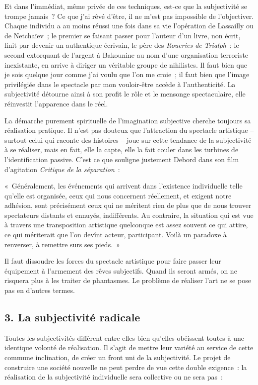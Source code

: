 \documentclass[french,twoside]{book} %
\newenvironment{quoteblock}%
  {\begin{quoting}}
  {\end{quoting}}
\newenvironment{quotebar}{%
    \def\FrameCommand{{\color{rubric!10!}\vrule width 0.5em} \hspace{0.9em}}%
    \def\OuterFrameSep{\itemsep} %
    \MakeFramed {\advance\hsize-\width \FrameRestore}
  }%
  {%
    \endMakeFramed
  }
\renewenvironment{quoteblock}%
  {%
    \savenotes
    \setstretch{0.9}
    \normalfont
    \begin{quotebar}
  }
  {%
    \end{quotebar}
    \spewnotes
  }
\begin{document}
Et dans l’immédiat, même privée de ces techniques, est-ce que la subjectivité se trompe jamais ? Ce que j’ai rêvé d’être, il ne m’est pas impossible de l’objectiver. Chaque individu a au moins réussi une fois dans sa vie l’opération de Lassailly ou de Netchaïev ; le premier se faisant passer pour l’auteur d’un livre, non écrit, finit par devenir un authentique écrivain, le père des \emph{Roueries de Trialph} ; le second extorquant de l’argent à Bakounine au nom d’une organisation terroriste inexistante, en arrive à diriger un véritable groupe de nihilistes. Il faut bien que je sois quelque jour comme j’ai voulu que l’on me croie ; il faut bien que l’image privilégiée dans le spectacle par mon vouloir-être accède à l’authenticité. La subjectivité détourne ainsi à son profit le rôle et le mensonge spectaculaire, elle réinvestit l’apparence dans le réel.\par
La démarche purement spirituelle de l’imagination subjective cherche toujours sa réalisation pratique. Il n’est pas douteux que l’attraction du spectacle artistique – surtout celui qui raconte des histoires – joue sur cette tendance de la subjectivité à se réaliser, mais en fait, elle la capte, elle la fait couler dans les turbines de l’identification passive. C’est ce que souligne justement Debord dans son film d’agitation \emph{Critique de la séparation} :\par

\begin{quoteblock}
\noindent « Généralement, les événements qui arrivent dans l’existence individuelle telle qu’elle est organisée, ceux qui nous concernent réellement, et exigent notre adhésion, sont précisément ceux qui ne méritent rien de plus que de nous trouver spectateurs distants et ennuyés, indifférents. Au contraire, la situation qui est vue à travers une transposition artistique quelconque est assez souvent ce qui attire, ce qui mériterait que l’on devînt acteur, participant. Voilà un paradoxe à renverser, à remettre surs ses pieds. »\end{quoteblock}

\noindent  Il faut dissoudre les forces du spectacle artistique pour faire passer leur équipement à l’armement des rêves subjectifs. Quand ils seront armés, on ne risquera plus à les traiter de phantasmes. Le problème de réaliser l’art ne se pose pas en d’autres termes.
\subsection[{3. La subjectivité radicale}]{\textsc{3. }La subjectivité radicale}
\noindent Toutes les subjectivités diffèrent entre elles bien qu’elles obéissent toutes à une identique volonté de réalisation. Il s’agit de mettre leur variété au service de cette commune inclination, de créer un front uni de la subjectivité. Le projet de construire une société nouvelle ne peut perdre de vue cette double exigence : la réalisation de la subjectivité individuelle sera collective ou ne sera pas :\par
\end{document}
